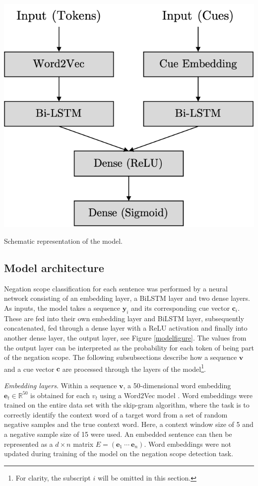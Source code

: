 \documentclass{article}
\begin{document}
\begin{multicols}{2}
\begin{center}
\captionsetup{type=figure}
	\includegraphics[scale=0.5]{model2}
	\caption{Schematic representation of the model.}
	\label{modelfigure}
\end{center}

\subsection{Model architecture}
Negation scope classification for each sentence was performed by a neural network consisting of an embedding layer, a BiLSTM layer and two dense layers. As inputs, the model takes a sequence $\mathbf{y}_i$ and its corresponding cue vector $\mathbf{c}_i$. These are fed into their own embedding layer and BiLSTM layer, subsequently concatenated, fed through a dense layer with a ReLU activation and finally into another dense layer, the output layer, see Figure \ref{modelfigure}. The values from the output layer can be interpreted as the probability for each token of being part of the negation scope. The following subsubsections describe how a sequence $\mathbf{v}$ and a cue vector $\mathbf{c}$ are processed through the layers of the model\footnote{For clarity, the subscript $i$ will be omitted in this section.}. \newline

\textit{Embedding layers}.
Within a sequence $\mathbf{v}$, a 50-dimensional word embedding $\mathbf{e}_t \in \mathbb{R}^{50}$ is obtained for each $v_{t}$ using a Word2Vec model \citep{word2vec}. Word embeddings were trained on the entire data set with the skip-gram algorithm, where the task is to correctly identify the context word of a target word from a set of random negative samples and the true context word. Here, a context window size of 5 and a negative sample size of 15 were used. An embedded sentence can then be represented as a $d \times n$ matrix $E = (\mathbf{e}_{1}~\cdots~\mathbf{e}_{n})$. Word embeddings were not updated during training of the model on the negation scope detection task.


\end{multicols}
\end{document}
